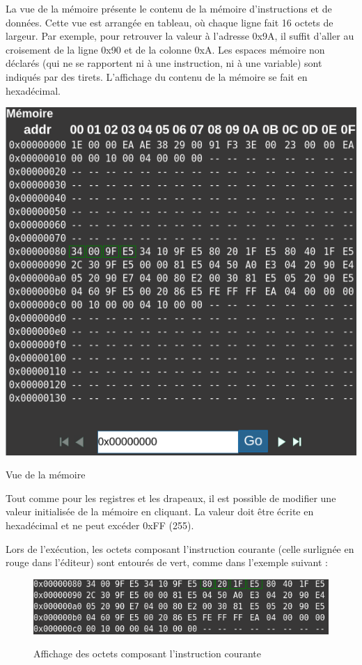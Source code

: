 \documentclass{tufte-handout}
\begin{document}
La vue de la mémoire présente le contenu de la mémoire d'instructions et de données. Cette vue est arrangée en tableau, où chaque ligne fait 16 octets de largeur.
Par exemple, pour retrouver la valeur à l'adresse 0x9A, il suffit d'aller au croisement de la ligne 0x90 et de la colonne 0xA.
Les espaces mémoire non déclarés (qui ne se rapportent ni à une instruction, ni à une variable) sont indiqués par des tirets. L'affichage du contenu de la mémoire se fait en hexadécimal.
\begin{marginfigure}
\includegraphics[width=0.9\linewidth]{pics/memoire.png}
\label{f:memoire}
\caption{Vue de la mémoire}
\end{marginfigure}
Tout comme pour les registres et les drapeaux, il est possible de modifier une valeur initialisée de la mémoire en cliquant. La valeur doit être écrite en hexadécimal et ne peut excéder 0xFF (255).

Lors de l'exécution, les octets composant l'instruction courante (celle surlignée en rouge dans l'éditeur) sont entourés de vert, comme dans l'exemple suivant :
\begin{figure}[h!]
\raggedleft
\includegraphics[width=0.8\linewidth]{pics/memoire_pc.png}
\label{f:memoirepc}
\caption{Affichage des octets composant l'instruction courante}
\end{figure}
\end{document}
